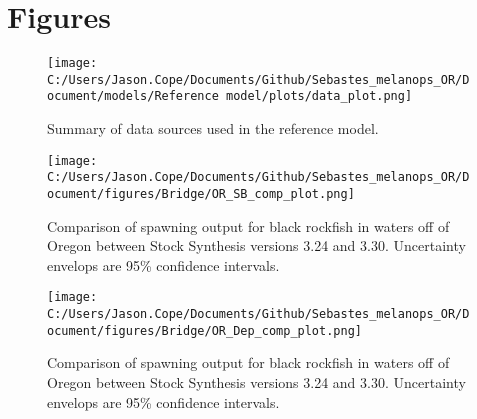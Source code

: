 \documentclass[11pt,
  english,
  letterpaper,
]{article}
\begin{document}
\clearpage

\hypertarget{figures}{%
\section{Figures}\label{figures}}

\begin{figure}
\centering
\texttt{[image: C:/Users/Jason.Cope/Documents/Github/Sebastes\_melanops\_OR/Document/models/Reference model/plots/data\_plot.png]}
\caption{Summary of data sources used in the reference model.\label{fig:data-plot}}
\end{figure}

\begin{figure}
\centering
\texttt{[image: C:/Users/Jason.Cope/Documents/Github/Sebastes\_melanops\_OR/Document/figures/Bridge/OR\_SB\_comp\_plot.png]}
\caption{Comparison of spawning output for black rockfish in waters off of Oregon between Stock Synthesis versions 3.24 and 3.30. Uncertainty envelops are 95\% confidence intervals.\label{fig:ssb_bridge_comps}}
\end{figure}

\begin{figure}
\centering
\texttt{[image: C:/Users/Jason.Cope/Documents/Github/Sebastes\_melanops\_OR/Document/figures/Bridge/OR\_Dep\_comp\_plot.png]}
\caption{Comparison of spawning output for black rockfish in waters off of Oregon between Stock Synthesis versions 3.24 and 3.30. Uncertainty envelops are 95\% confidence intervals.\label{fig:deps_bridge_comps}}
\end{figure}
\end{document}
